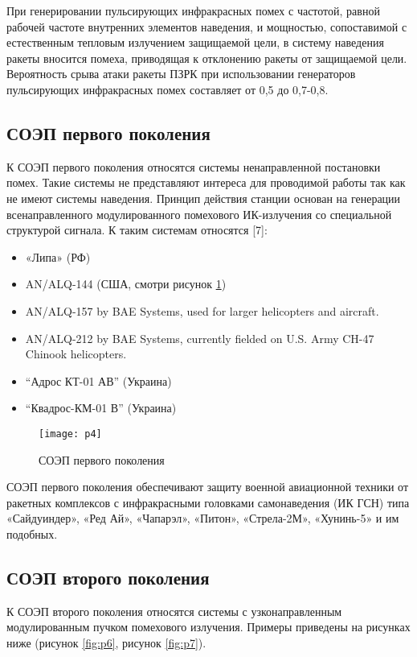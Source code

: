 При генерировании пульсирующих инфракрасных помех с частотой, равной рабочей частоте внутренних элементов наведения, и мощностью, сопоставимой с естественным тепловым излучением защищаемой цели, в систему наведения ракеты вносится помеха, приводящая к отклонению ракеты от защищаемой цели. Вероятность срыва атаки ракеты ПЗРК при использовании генераторов пульсирующих инфракрасных помех составляет от 0,5 до 0,7-0,8.

\subsection{СОЭП первого поколения}	

К СОЭП первого поколения относятся системы ненаправленной постановки помех. Такие системы не представляют интереса для проводимой работы так как не имеют системы наведения. Принцип действия станции основан на генерации всенаправленного модулированного помехового ИК-излучения со специальной структурой сигнала. К таким системам относятся [7]:

\begin{itemize}
	\item «Липа» (РФ)	
	\item AN/ALQ-144 (США, смотри рисунок \ref{fig:alq})	
	\item AN/ALQ-157 by BAE Systems, used for larger helicopters and aircraft.
	\item AN/ALQ-212 by BAE Systems, currently fielded on U.S. Army CH-47 Chinook helicopters.
	\item “Адрос КТ-01 АВ” (Украина)
	\item “Квадрос-КМ-01 В” (Украина) 		
\end{itemize}

\begin{figure}[ht]
	\texttt{[image: p4]} 
	\caption{СОЭП первого поколения}
	\label{fig:alq}
\end{figure}

СОЭП первого поколения обеспечивают защиту военной авиационной техники от ракетных комплексов с инфракрасными головками самонаведения (ИК ГСН) типа «Сайдуиндер», «Ред Ай», «Чапарэл», «Питон», «Стрела-2М», «Хунинь-5» и им подобных. 

\subsection{СОЭП второго поколения}	

К СОЭП второго поколения относятся системы с узконаправленным модулированным пучком помехового излучения. Примеры приведены на рисунках ниже (рисунок \ref{fig:p6}, рисунок \ref{fig:p7}).

